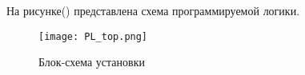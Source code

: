 На рисунке() представлена схема программируемой логики. 
\begin{figure}[ht]
    \centering
    \texttt{[image: PL\_top.png]}
    \caption{Блок-схема установки}
    \label{fig:mpr}
\end{figure}
